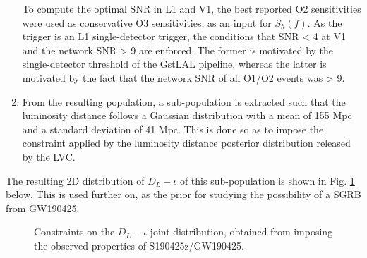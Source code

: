 \begin{enumerate}
            To compute the optimal SNR in L1 and V1, the best reported O2 sensitivities
            were used as conservative O3 sensitivities, as an input for $S_h(f)$.  As
            the trigger is an L1 single-detector trigger, the conditions that SNR < 4 at
            V1 and the network SNR > 9 are enforced. The former is motivated by the
            single-detector threshold of the GstLAL pipeline, whereas the latter is
            motivated by the fact that the network SNR of all O1/O2 events was > 9.

        \item From the resulting population, a sub-population is extracted such that the
            luminosity distance follows a Gaussian distribution with a mean of 155 Mpc
            and a standard deviation of 41 Mpc. This is done so as to impose the
            constraint applied by the luminosity distance posterior distribution
            released by the LVC.

    \end{enumerate}

        The resulting 2D distribution of $D_L-\iota$ of this sub-population is shown in
        Fig. \ref{fig:dl_iota} below. This is used further on, as the prior for studying
        the possibility of a SGRB from GW190425.

    \begin{figure}[H]
        \centering
        \def\svgwidth{0.9\textwidth}
        
        \caption[$D_L-\iota$ Posterior distribution.]
        {
            Constraints on the $D_L-\iota$ joint distribution, obtained from
            imposing the observed properties of S190425z/GW190425.
        }
        \label{fig:dl_iota}
    \end{figure}

